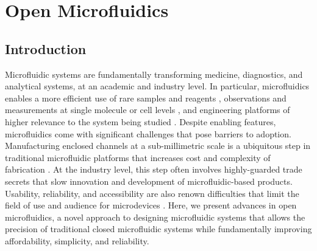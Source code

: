 \chapter{Open Microfluidics}
\label{Chap:OpenMicrofluidics}


\section{Introduction}
Microfluidic systems are fundamentally transforming medicine, diagnostics, and analytical systems, at an academic and industry level. In particular, microfluidics enables a more efficient use of rare samples and reagents \cite{Burns1998, Ingham2007, Song2006a, Thorsen2002a}, observations and measurements at single molecule or cell levels \cite{Kopp1998, Hong2012}, and engineering platforms of higher relevance to the system being studied \cite{Berthier2013,Huh2010a,Jeon2015,Meyvantsson2008,Sackmann2014a,Domenech2009}. Despite enabling features, microfluidics come with significant challenges that pose barriers to adoption. Manufacturing enclosed channels at a sub-millimetric scale is a ubiquitous step in traditional microfluidic platforms that increases cost and complexity of fabrication \cite{Guckenberger2015b,Sackmann2014}. At the industry level, this step often involves highly-guarded trade secrets that slow innovation and development of microfluidic-based products. Usability, reliability, and accessibility are also renown difficulties that limit the field of use and audience for microdevices \cite{Casavant2013, Sackmann2014}. Here, we present advances in open microfluidics, a novel approach to designing microfluidic systems that allows the precision of traditional closed microfluidic systems while fundamentally improving affordability, simplicity, and reliability.

